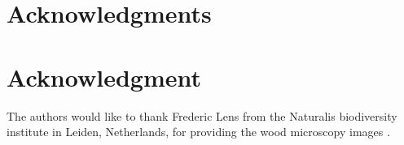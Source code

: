 \documentclass[conference,compsoc]{IEEEtran}
\begin{document}
\ifCLASSOPTIONcompsoc
  \section*{Acknowledgments}
\else
  \section*{Acknowledgment}
\fi
The authors would like to thank Frederic Lens from the Naturalis biodiversity institute in Leiden, Netherlands, for providing the wood microscopy images \cite{wood}.



%
%
%





\end{document}
